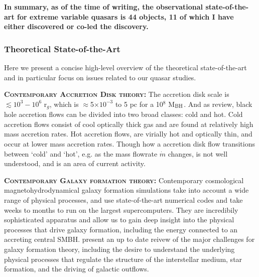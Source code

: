 \smallskip
\smallskip
\noindent
{\bf In summary, as of the time of writing, the
observational state-of-the-art for extreme variable quasars is 44
objects, 11 of which I have either discovered or co-led the
discovery.}




\subsubsection{Theoretical State-of-the-Art}
Here we present a concise high-level overview of the theoretical
state-of-the-art and in particular focus on issues related to our
quasar studies.

\smallskip
\smallskip
\noindent
\textbf{\textsc{Contemporary Accretion Disk theory:}}
The accretion disk scale is $\lesssim 10^{3}-10^{6}$ r$_{g}$,
which is $\approx$5$\times$$10^{-3}$ to 5 pc for a 10$^{8}$ M$_{\rm
BH}$.  
And as \citet{YuanNarayan2014} review, black hole accretion flows can be divided into two broad classes: cold and hot. Cold accretion flows consist of cool optically thick gas and are found at relatively high mass accretion rates. 
Hot accretion flows, are virially hot and optically thin, and occur at lower mass accretion rates. %
Though how a accretion disk flow transitions between `cold' and `hot', e.g. as the mass flowrate $\dot{m}$ changes, is not well understood, and is an area of current activity. %


\smallskip
\smallskip
\noindent
\textbf{\textsc{Contemporary Galaxy formation theory:}}
Contemporary cosmological magnetohydrodynamical galaxy formation
simulations take into account a wide range of physical processes, and
use state-of-the-art numerical codes and take weeks to months to run
on the largest supercomputers.  They are incredibily sophisticated
apparatus and allow us to gain deep insight into the physical
processes that drive galaxy formation, including the energy connected
to an accreting central SMBH. \citet{NaabOstriker2017} present an up
to date reivew of the major challenges for galaxy formation theory,
including the desire to understand the underlying physical processes
that regulate the structure of the interstellar medium, star
formation, and the driving of galactic outflows.

